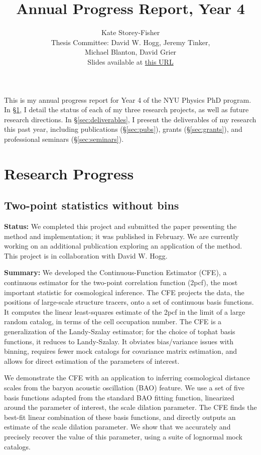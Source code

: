 \documentclass{article}
\title{Annual Progress Report, Year 4}
\author{Kate Storey-Fisher \\
Thesis Committee: David W. Hogg, Jeremy Tinker, \\
Michael Blanton, David Grier \\
Slides available at \href{https://docs.google.com/presentation/d/1hqaPXNtvDq3Bnf1CegbAA840C_V2PaNjywn1dg2yrPM/edit?usp=sharing}{this URL}
}
\begin{document}
\maketitle


This is my annual progress report for Year 4 of the NYU Physics PhD program. In \S\ref{sec:research}, I detail the status of each of my three research projects, as well as future research directions. In \S\ref{sec:deliverables}, I present the deliverables of my research this past year, including publications (\S\ref{sec:pubs}), grants (\S\ref{sec:grants}), and professional seminars (\S\ref{sec:seminars}).

\section{Research Progress}
\label{sec:research}

\subsection{Two-point statistics without bins}

\hspace{\parindent} \textbf{Status:}
We completed this project and submitted the paper presenting the method and implementation; it was published in February.
We are currently working on an additional publication exploring an application of the method.
This project is in collaboration with David W. Hogg.

\textbf{Summary:}
We developed the Continuous-Function Estimator (CFE), a continuous estimator for the two-point correlation function (2pcf), the most important statistic for cosmological inference.
The CFE projects the data, the positions of large-scale structure tracers, onto a set of continuous basis functions.
It computes the linear least-squares estimate of the 2pcf in the limit of a large random catalog, in terms of the cell occupation number.
The CFE is a generalization of the Landy-Szalay estimator; for the choice of tophat basis functions, it reduces to Landy-Szalay.
It obviates bias/variance issues with binning, requires fewer mock catalogs for covariance matrix estimation, and allows for direct estimation of the parameters of interest.

We demonstrate the CFE with an application to inferring cosmological distance scales from the baryon acoustic oscillation (BAO) feature.
We use a set of five basis functions adapted from the standard BAO fitting function, linearized around the parameter of interest, the scale dilation parameter.
The CFE finds the best-fit linear combination of these basis functions, and directly outputs an estimate of the scale dilation parameter.
We show that we accurately and precisely recover the value of this parameter, using a suite of lognormal mock catalogs.
\end{document}
